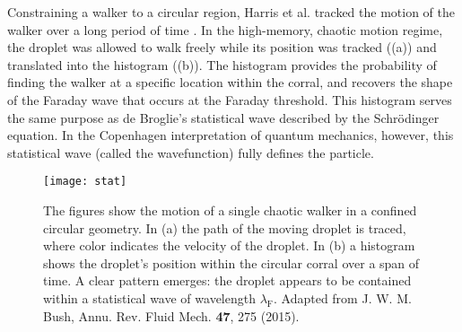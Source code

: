 





Constraining a walker to a circular region, Harris et al. tracked the motion of the walker over a long period of time \cite{Harris2013}. In the high-memory, chaotic motion regime, the droplet was allowed to walk freely while its position was tracked ((a)) and translated into the histogram ((b)). The histogram provides the probability of finding the walker at a specific location within the corral, and recovers the shape of the Faraday wave that occurs at the Faraday threshold. This histogram serves the same purpose as de Broglie's statistical wave described by the Schr\"{o}dinger equation. In the Copenhagen interpretation of quantum mechanics, however, this statistical wave (called the wavefunction) fully defines the particle. 

\begin{figure}[h]
	       \centering
	    \texttt{[image: stat]}
	     \caption{ The figures show the motion of a single chaotic walker in a confined circular geometry. In (a) the path of the moving droplet is traced, where color indicates the velocity of the droplet. In (b) a histogram shows the droplet's position within the circular corral over a span of time. A clear pattern emerges: the droplet appears to be contained within a statistical wave of wavelength $\lambda_\mathrm{F}$. Adapted from J. W. M. Bush, Annu. Rev. Fluid Mech. \textbf{47}, 275 (2015).
	     }
	 \label{stat}
	\end{figure}



